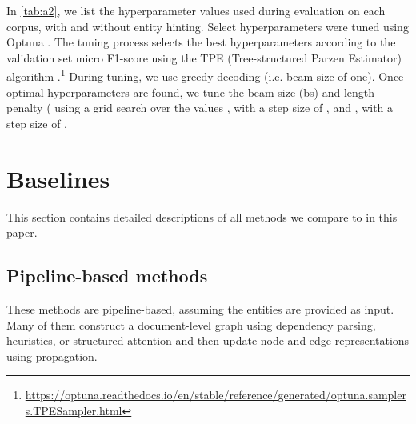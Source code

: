 \documentclass[11pt]{article}
\begin{document}
In \autoref{tab:a2}, we list the hyperparameter values used during evaluation on each corpus, with and without entity hinting. Select hyperparameters were tuned using Optuna \citep{optuna_2019}. The tuning process selects the best hyperparameters according to the validation set micro F1-score using the TPE (Tree-structured Parzen Estimator) algorithm \citep{Bergstra2011AlgorithmsFH}.\footnote{\url{https://optuna.readthedocs.io/en/stable/reference/generated/optuna.samplers.TPESampler.html}} During tuning, we use greedy decoding (i.e. beam size of one). Once optimal hyperparameters are found, we tune the beam size (bs) and length penalty ( using a grid search over the values , with a step size of , and , with a step size of .

\section{Baselines}
\label{appendix:baselines}

This section contains detailed descriptions of all methods we compare to in this paper. 

\subsection{Pipeline-based methods}

These methods are pipeline-based, assuming the entities are provided as input. Many of them construct a document-level graph using dependency parsing, heuristics, or structured attention and then update node and edge representations using propagation.
\end{document}

